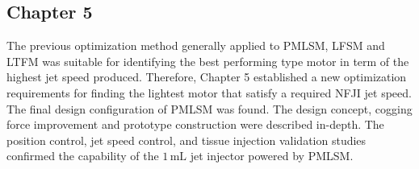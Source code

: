     
    \subsection{Chapter 5}  \label{Chapter:intro/outline/chapter5}
    
    
    The previous optimization method generally applied to \acs{PMLSM}, \acs{LFSM} and \acs{LTFM} was suitable for identifying the best performing type motor in term of the highest jet speed produced. Therefore, Chapter 5 established a new optimization requirements for finding the lightest motor that satisfy a required \acs{NFJI} jet speed. The final design configuration of \acs{PMLSM} was found. The design concept, cogging force improvement and prototype construction were described in-depth. The position control, jet speed control, and tissue injection validation studies confirmed the capability of the $1\,\mathrm{mL}$ jet injector powered by \acs{PMLSM}.
    